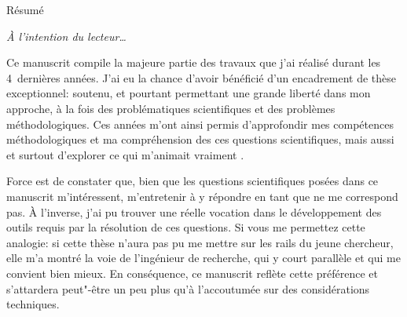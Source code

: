 
\thispagestyle{thesis-empty}

Résumé

\begin{comment}

\clearpage
\thispagestyle{thesis-empty}

\section*{Remerciements}
\label{sec:thanks}

la colloc étendu: théo, thomas, arthur, rémi, rémy, clément, sarah
parler du confinement ?
les potos: benjamin, marie, charlie, paul, jessie, piwi

la mifa

mon comité de thèse ? Sakina, Daniele

le 426 le meilleur bureau, tous les autres doctorants et post-doctorants et stagiaires
c'est quand même vachement plus fun avec elleux.

l'équipe admin du labo, bigup
\end{comment}

\clearpage
\thispagestyle{thesis-empty}

\vspace*{5ex}
\par\addvspace{\beforesecskip}\addvspace{\baselineskip}
\par\noindent\textit{À l'intention du lecteur\dots}\par
\vspace{\aftersecskip}

Ce manuscrit compile la majeure partie des travaux que j'ai réalisé durant les 4~dernières années.
J'ai eu la chance d'avoir bénéficié d'un encadrement de thèse exceptionnel: soutenu, et pourtant permettant une grande liberté dans mon approche, à la fois des problématiques scientifiques et des problèmes méthodologiques.
Ces années m'ont ainsi permis d'approfondir mes compétences méthodologiques et ma compréhension des ces questions scientifiques, mais aussi et surtout d'explorer ce qui m'animait vraiment .

Force est de constater que, bien que les questions scientifiques posées dans ce manuscrit m'intéressent, m'entretenir à y répondre en tant que  ne me correspond pas.
À l'inverse, j'ai pu trouver une réelle vocation dans le développement des outils requis par la résolution de ces questions.
Si vous me permettez cette analogie: si cette thèse n'aura pas pu me mettre sur les rails du jeune chercheur, elle m'a montré la voie de l'ingénieur de recherche, qui y court parallèle et qui me convient bien mieux.
En conséquence, ce manuscrit reflète cette préférence et s'attardera peut"-être un peu plus qu'à l'accoutumée sur des considérations techniques.


